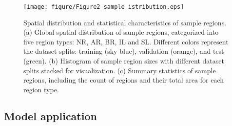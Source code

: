 \documentclass[preprint,12pt,authoryear]{elsarticle}
\begin{document}
\begin{figure}[h]
    \centering
    \texttt{[image: figure/Figure2\_sample\_istribution.eps]}
    \caption{Spatial distribution and statistical characteristics of sample regions. (a) Global spatial distribution of sample regions, categorized into five region types: NR, AR, BR, IL and SL. Different colors represent the dataset splits: training (sky blue), validation (orange), and test (green). (b) Histogram of sample region sizes with different dataset splits stacked for visualization. (c) Summary statistics of sample regions, including the count of regions and their total area for each region type.}
    \label{fig:Fig2}
\end{figure}

\subsection{Model application}
\label{subsec3}
\end{document}
